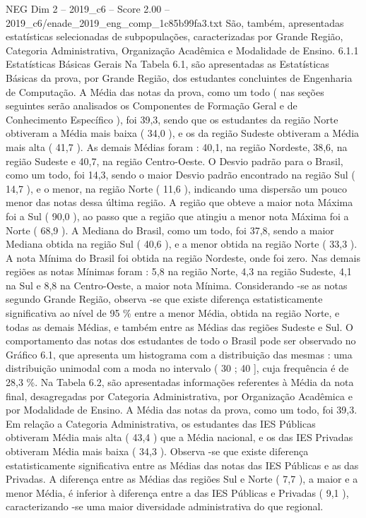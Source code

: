 \begin{textsample}{NEG Dim 2 – 2019\_c6 – Score 2.00 – 2019\_c6/enade\_2019\_eng\_comp\_1c85b99fa3.txt}
São, também, apresentadas estatísticas selecionadas de subpopulações, caracterizadas por Grande Região, Categoria Administrativa, Organização Acadêmica e Modalidade de Ensino. 6.1.1 Estatísticas Básicas Gerais Na Tabela 6.1, são apresentadas as Estatísticas Básicas da prova, por Grande Região, dos estudantes concluintes de Engenharia de Computação.
A Média das notas da prova, como um todo ( nas seções seguintes serão analisados os Componentes de Formação Geral e de Conhecimento Específico ), foi 39,3, sendo que os estudantes da região Norte obtiveram a Média mais baixa ( 34,0 ), e os da região Sudeste obtiveram a Média mais alta ( 41,7 ).
As demais Médias foram : 40,1, na região Nordeste, 38,6, na região Sudeste e 40,7, na região Centro-Oeste.
O Desvio padrão para o Brasil, como um todo, foi 14,3, sendo o maior Desvio padrão encontrado na região Sul ( 14,7 ), e o menor, na região Norte ( 11,6 ), indicando uma dispersão um pouco menor das notas dessa última região.
A região que obteve a maior nota Máxima foi a Sul ( 90,0 ), ao passo que a região que atingiu a menor nota Máxima foi a Norte ( 68,9 ).
A Mediana do Brasil, como um todo, foi 37,8, sendo a maior Mediana obtida na região Sul ( 40,6 ), e a menor obtida na região Norte ( 33,3 ).
A nota Mínima do Brasil foi obtida na região Nordeste, onde foi zero.
Nas demais regiões as notas Mínimas foram : 5,8 na região Norte, 4,3 na região Sudeste, 4,1 na Sul e 8,8 na Centro-Oeste, a maior nota Mínima.
Considerando -se as notas segundo Grande Região, observa -se que existe diferença estatisticamente significativa ao nível de 95 \% entre a menor Média, obtida na região Norte, e todas as demais Médias, e também entre as Médias das regiões Sudeste e Sul.
O comportamento das notas dos estudantes de todo o Brasil pode ser observado no Gráfico 6.1, que apresenta um histograma com a distribuição das mesmas : uma distribuição unimodal com a moda no intervalo ( 30 ; 40 ], cuja frequência é de 28,3 \%.
Na Tabela 6.2, são apresentadas informações referentes à Média da nota final, desagregadas por Categoria Administrativa, por Organização Acadêmica e por Modalidade de Ensino.
A Média das notas da prova, como um todo, foi 39,3.
Em relação a Categoria Administrativa, os estudantes das IES Públicas obtiveram Média mais alta ( 43,4 ) que a Média nacional, e os das IES Privadas obtiveram Média mais baixa ( 34,3 ).
Observa -se que existe diferença estatisticamente significativa entre as Médias das notas das IES Públicas e as das Privadas.
A diferença entre as Médias das regiões Sul e Norte ( 7,7 ), a maior e a menor Média, é inferior à diferença entre a das IES Públicas e Privadas ( 9,1 ), caracterizando -se uma maior diversidade administrativa do que regional.

\end{textsample}
